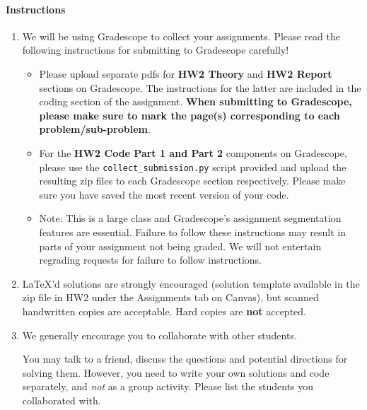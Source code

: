 \documentclass[11pt,english]{article}
\begin{document}
\paragraph*{Instructions}
\begin{enumerate}
\item We will be using Gradescope to collect your assignments.  Please read the following instructions for submitting to Gradescope carefully!
     \begin{itemize}
          \item
               Please upload separate pdfs for \textbf{HW2 Theory} and \textbf{HW2 Report} sections on Gradescope. The instructions for the latter are included in the coding section of the assignment.  \textbf{When submitting to Gradescope, please make sure to mark the page(s) corresponding to each problem/sub-problem}.
          \item
               For the \textbf{HW2 Code Part 1 and Part 2} components on Gradescope, 
               please use the \texttt{collect\_submission.py} script provided and upload the resulting zip files to each Gradescope section respectively. Please make sure you have saved the most recent version of your code.
          \item
               Note: This is a large class and Gradescope's assignment segmentation features are essential.
               Failure to follow these instructions may result in parts of your assignment not being graded.
               We will not entertain regrading requests for failure to follow instructions.
     \end{itemize}

\item
     \LaTeX'd solutions are strongly encouraged (solution template available in the zip file in HW2 under the Assignments tab on Canvas),
     but scanned handwritten copies are acceptable.
     Hard copies are \textbf{not} accepted.


\item We generally encourage you to collaborate with other students.

You may talk to a friend, discuss the questions and potential directions for solving them. However, you need to write
your own solutions and code separately, and \emph{not} as a group activity.
Please list the students you collaborated with. \\ \\
\end{enumerate}
\newpage
\end{document}
